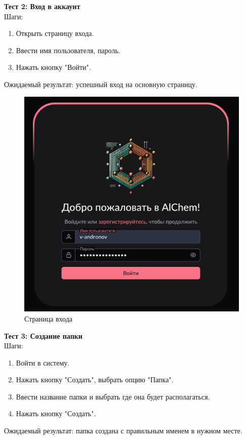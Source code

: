 \documentclass[a4paper,12pt,reqno]{article}
\begin{document}
    \textbf{Тест 2: Вход в аккаунт}\\
    Шаги:
    \begin{enumerate}
        \item Открыть страницу входа.
        \item Ввести имя пользователя, пароль.
        \item Нажать кнопку "Войти".
    \end{enumerate}
    Ожидаемый результат: успешный вход на основную страницу.

    \begin{figure}[H]
        \centering
        \includegraphics[width=0.5\linewidth]{img/signin.png}
        \caption{Страница входа}
    \end{figure}
    \vspace{0.5cm}

    \textbf{Тест 3: Создание папки}\\
    Шаги:
    \begin{enumerate}
        \item Войти в систему.
        \item Нажать кнопку "Создать", выбрать опцию "Папка".
        \item Ввести название папки и выбрать где она будет располагаться.
        \item Нажать кнопку "Создать".
    \end{enumerate}
    Ожидаемый результат: папка создана с правильным именем в нужном месте.
\end{document}
